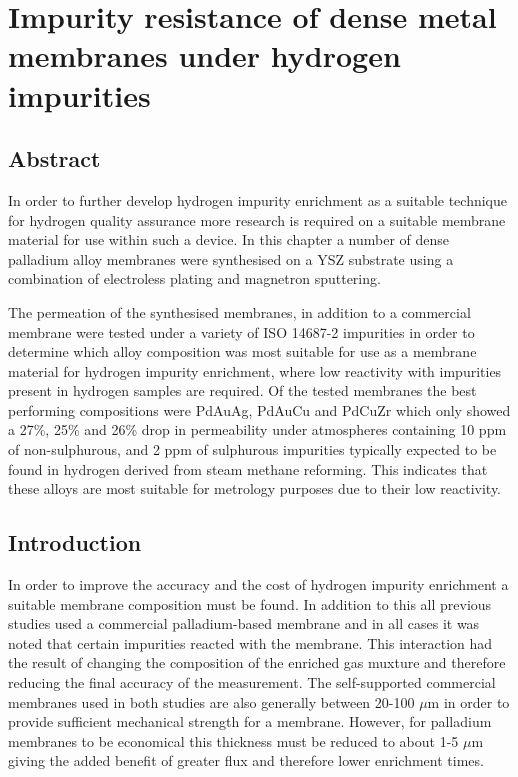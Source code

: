 

\chapter{Impurity resistance of dense metal membranes under hydrogen impurities}
\section {Abstract}
In order to further develop hydrogen impurity enrichment as a suitable technique for hydrogen quality assurance more research is required on a suitable membrane material for use within such a device. In this chapter a number of dense palladium alloy membranes were synthesised on a YSZ substrate using a combination of electroless plating and magnetron sputtering. 

The permeation of the synthesised membranes, in addition to a commercial membrane were tested under a variety of ISO 14687-2 impurities in order to determine which alloy composition was most suitable for use as a membrane material for hydrogen impurity enrichment, where low reactivity with impurities present in hydrogen samples are required. Of the tested membranes the best performing compositions were PdAuAg, PdAuCu and PdCuZr which only showed a 27\%, 25\% and 26\% drop in permeability under atmospheres containing 10 ppm of non-sulphurous, and 2 ppm of sulphurous impurities typically expected to be found in hydrogen derived from steam methane reforming.  This indicates that these alloys are most suitable for metrology purposes due to their low reactivity. 

\section{Introduction}
In order to improve the accuracy and the cost of hydrogen impurity enrichment a suitable membrane composition must be found. In addition to this all previous studies used a commercial palladium-based membrane and in all cases it was noted that certain impurities reacted with the membrane. This interaction had the result of changing the composition of the enriched gas muxture and therefore reducing the final accuracy of the measurement. \cite{Murugan2014, Ahmed2010} The self-supported commercial membranes used in both studies are also generally between 20-100 $\mu$m in order to provide sufficient mechanical strength for a membrane. However, for palladium membranes to be economical this thickness must be reduced to about 1-5 $\mu$m giving the added benefit of greater flux and therefore lower enrichment times. 


